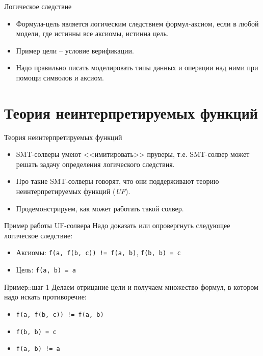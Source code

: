 \documentclass[hyperref={unicode=true}]{beamer}
\begin{document}
    \begin{frame}{Логическое следствие}
    \begin{itemize}
    \item
    Формула-цель является логическим следствием формул-аксиом,
    если в любой модели, где истинны все аксиомы, истинна цель.
    \item
    Пример цели -- условие верификации.
    \item
    Надо правильно писать моделировать типы данных и операции
    над ними при помощи символов и аксиом.
    \end{itemize}
    \end{frame}

    \section{Теория неинтерпретируемых функций}

    \begin{frame}{Теория неинтерпретируемых функций}
    \begin{itemize}
    \item
    SMT-солверы умеют <<имитировать>> пруверы, т.е.
    SMT-солвер может решать задачу определения логического следствия.
    \item
    Про такие SMT-солверы говорят, что они поддерживают
    теорию неинтерпретируемых функций (\textsl{UF}).
    \item
    Продемонстрируем, как может работать такой солвер.
    \end{itemize}
    \end{frame}

    \begin{frame}{Пример работы UF-солвера}
    Надо доказать или опровергнуть следующее
    логическое следствие:
    \begin{itemize}
    \item
    Аксиомы: \texttt{f(a, f(b, c)) != f(a, b)},
    \texttt{f(b, b) = c}
    \item
    Цель: \texttt{f(a, b) = a}
    \end{itemize}
    \end{frame}

    \begin{frame}{Пример::шаг 1}
    Делаем отрицание цели и получаем множество формул,
    в котором надо искать противоречие:

    \begin{itemize}
    \item \texttt{f(a, f(b, c)) != f(a, b)}
    \item \texttt{f(b, b) = c}
    \item \texttt{f(a, b) != a}
    \end{itemize}
    \end{frame}
\end{document}
